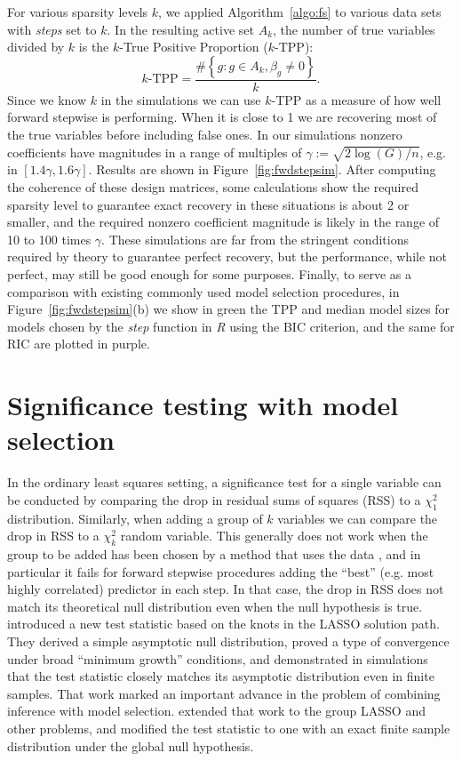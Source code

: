 \documentclass{imsart}
\begin{document}
For various sparsity levels $k$, we applied Algorithm~\ref{algo:fs} to
various data sets with \textit{steps} set to $k$.
In the resulting active set $A_k$, the number of true variables divided by $k$ is the $k$-True Positive Proportion ($k$-TPP):
\[
k\text{-TPP} = \frac{\# \left\{g: g \in A_k, \beta_g \neq 0\right\}}{k}.
\]
Since we know $k$ in the simulations we can use $k$-TPP as a measure of how well forward stepwise is performing. When it is close to 1 we are recovering most of the true variables before including false ones.
In our simulations nonzero coefficients have magnitudes
in a range of multiples of $\gamma := \sqrt{2\log(G)/n}$, e.g. in $[1.4
\gamma, 1.6 \gamma]$. Results are shown in
Figure~\ref{fig:fwdstepsim}. After computing the
coherence of these design matrices, some calculations show the required
sparsity level to guarantee exact recovery in these situations is
about 2 or smaller, and the required nonzero coefficient magnitude is
likely in the range of 10 to 100 times $\gamma$. These simulations are far
from the stringent conditions required by theory to guarantee perfect
recovery, but the performance, while not perfect, may still be good
enough for some purposes. Finally, to serve as a comparison with existing
commonly used model selection procedures, in Figure~\ref{fig:fwdstepsim}(b)
we show in green the TPP and median model sizes for models chosen by
the \textit{step} function in \textit{R} using the BIC criterion, and
the same for RIC are plotted in purple.



\section{Significance testing with model selection}
\label{sec:testing}

In the ordinary least squares setting, a significance test for a
single variable can be conducted by comparing the drop in residual
sums of squares (RSS) to a $\chi^2_1$ distribution. Similarly, when
adding a group of $k$ variables we can compare the drop in RSS to a
$\chi^2_k$ random variable. This generally does not work when the
group to be added has been chosen by a method that uses the data
\citep{olshen:flevel},
and in particular it fails for forward stepwise procedures adding
the ``best'' (e.g. most highly correlated) predictor in each step. In
that case, the drop in RSS does not match its
theoretical null distribution even when the null hypothesis is
true. \cite{significance:lasso} introduced a new test statistic based
on the knots in the LASSO solution path. They derived a simple
asymptotic null distribution, proved a type of convergence under broad
``minimum growth'' conditions, and demonstrated in simulations that
the test statistic closely matches its asymptotic distribution even in
finite samples.  That work marked an important advance in the problem
of combining inference with model selection.  \cite{tests:adaptive}
extended that work to the group LASSO \citep{grouplasso} and other
problems, and modified the test statistic to one with an exact finite
sample distribution under the global null hypothesis.
\end{document}
